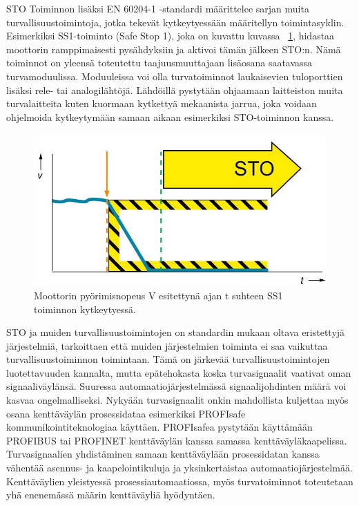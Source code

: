 \documentclass[finnish,12pt,a4paper,pdftex,elec,utf8]{aaltothesis}
\begin{document}
\noindent
STO Toiminnon lisäksi EN 60204-1 -standardi määrittelee sarjan muita turvallisuustoimintoja, jotka tekevät kytkeytyessään määritellyn toimintasyklin. Esimerkiksi SS1-toiminto (Safe Stop 1), joka on kuvattu kuvassa ~\ref{fig:SS1}, hidastaa moottorin ramppimaisesti pysähdyksiin ja aktivoi tämän jälkeen STO:n. Nämä toiminnot on yleensä toteutettu taajuusmuuttajaan lisäosana saatavassa turvamoduulissa. Moduuleissa voi olla turvatoiminnot laukaisevien tuloporttien lisäksi rele- tai analogilähtöjä. Lähdöillä pystytään ohjaamaan laitteiston muita turvalaitteita kuten kuormaan kytkettyä mekaanista jarrua, joka voidaan ohjelmoida kytkeytymään samaan aikaan esimerkiksi STO-toiminnon kanssa\cite{FSO}.

\begin{figure}[H]
	\begin{center}
	\includegraphics[scale=0.5]{SS1}
	\end{center}
	\caption{Moottorin pyörimisnopeus V esitettynä ajan t suhteen SS1 toiminnon kytkeytyessä.
		\cite{SS1kuva}}
	\label{fig:SS1}
\end{figure}

\noindent
STO ja muiden turvallisuustoimintojen on standardin mukaan oltava eristettyjä järjestelmiä, tarkoittaen että muiden järjestelmien toiminta ei saa vaikuttaa turvallisuustoiminnon toimintaan. Tämä on järkevää turvallisuustoimintojen luotettavuuden kannalta, mutta epätehokasta koska turvasignaalit vaativat oman signaaliväylänsä. Suuressa automaatiojärjestelmässä signaalijohdinten määrä voi kasvaa ongelmalliseksi. Nykyään turvasignaalit onkin mahdollista kuljettaa myös osana kenttäväylän prosessidataa esimerkiksi PROFIsafe kommunikointiteknologiaa käyttäen. PROFIsafea pystytään käyttämään PROFIBUS tai PROFINET kenttäväylän kanssa samassa kenttäväyläkaapelissa. Turvasignaalien yhdistäminen samaan kenttäväylään prosessidatan kanssa vähentää asennus- ja kaapelointikuluja ja yksinkertaistaa automaatiojärjestelmää\cite{MyyntiHaastattelu}. Kenttäväylien yleistyessä prosessiautomaatiossa, myös turvatoiminnot toteutetaan yhä enenemässä määrin kenttäväyliä hyödyntäen\cite{Profisafe}.
\\\\
\end{document}
